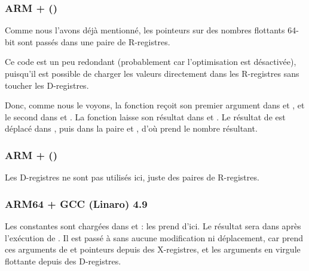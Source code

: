 \subsubsection{ARM + \NonOptimizingXcodeIV (\ThumbTwoMode)}
\label{FPU_passing_floats_ARM}



Comme nous l'avons déjà mentionné, les pointeurs sur des nombres flottants 64-bit
sont passés dans une paire de R-registres.

Ce code est un peu redondant (probablement car l'optimisation est désactivée),
puisqu'il est possible de charger les valeurs directement dans les R-registres sans
toucher les D-registres.

Donc, comme nous le voyons, la fonction  reçoit son premier argument dans
 et , et le second dans  et .
La fonction laisse son résultat dans  et .
Le résultat de  est déplacé dans , puis dans la paire 
et , d'où \printf prend le nombre résultant.

\subsubsection{ARM + \NonOptimizingKeilVI (\ARMMode)}



Les D-registres ne sont pas utilisés ici, juste des paires de R-registres.

\subsubsection{ARM64 + GCC (Linaro) 4.9 \Optimizing}



Les constantes sont chargées dans  et :  les prend d'ici.
Le résultat sera dans  après l'exécution de .
Il est passé à  \printf sans aucune modification ni déplacement, car \printf
prend ces arguments de  et pointeurs depuis
des X-registres, et les arguments en virgule flottante depuis des D-registres.

